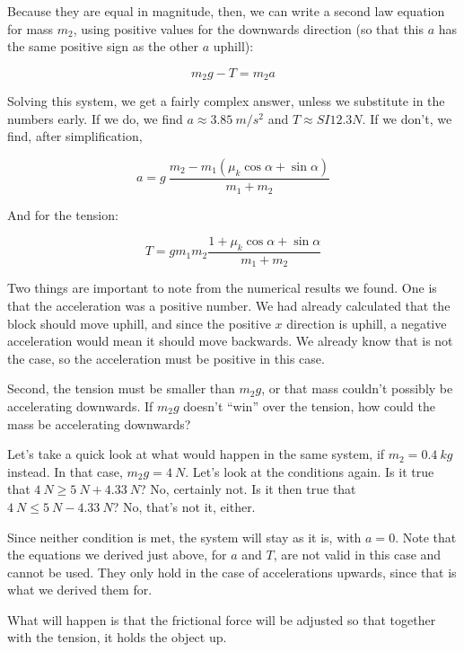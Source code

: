 \documentclass[8.01x]{subfiles}
\begin{document}
Because they are equal in magnitude, then, we can write a second law equation for mass $m_2$, using positive values for the downwards direction (so that this $a$ has the same positive sign as the other $a$ uphill):

\begin{equation}
m_2 g - T = m_2 a
\end{equation}

Solving this system, we get a fairly complex answer, unless we substitute in the numbers early. If we do, we find $a \approx \SI{3.85}{m/s^2}$ and $T \approx {SI}{12.3}{N}$. If we don't, we find, after simplification,

\begin{equation}
a = g\ \frac{m_2 - m_1 (\mu_k \cos \alpha + \sin \alpha)}{m_1 + m_2}
\end{equation}

And for the tension:

\begin{equation}
T = g m_1 m_2 \frac{1 + \mu_k \cos\alpha + \sin \alpha}{m_1 + m_2}
\end{equation}

Two things are important to note from the numerical results we found. One is that the acceleration was a positive number. We had already calculated that the block should move uphill, and since the positive $x$ direction is uphill, a negative acceleration would mean it should move backwards. We already know that is not the case, so the acceleration must be positive in this case.

Second, the tension must be smaller than $m_2 g$, or that mass couldn't possibly be accelerating downwards. If $m_2 g$ doesn't ``win'' over the tension, how could the mass be accelerating downwards?

Let's take a quick look at what would happen in the same system, if $m_2 = \SI{0.4}{kg}$ instead. In that case, $m_2 g = \SI{4}{N}$. Let's look at the conditions again. Is it true that $\SI{4}{N} \ge \SI{5}{N} + \SI{4.33}{N}$? No, certainly not. Is it then true that $\SI{4}{N} \le \SI{5}{N} - \SI{4.33}{N}$? No, that's not it, either.

Since neither condition is met, the system will stay as it is, with $a = 0$. Note that the equations we derived just above, for $a$ and $T$, are not valid in this case and cannot be used. They only hold in the case of accelerations upwards, since that is what we derived them for.

What will happen is that the frictional force will be adjusted so that together with the tension, it holds the object up.
\end{document}
